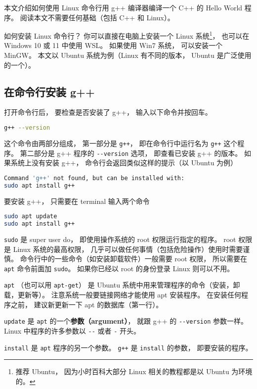 
本文介绍如何使用 Linux 命令行用 g++ 编译器编译一个 C++ 的 Hello World 程序。 阅读本文不需要任何基础（包括 C++ 和 Linux）。

如何安装 Linux 命令行？ 你可以直接在电脑上安装一个 Linux 系统\footnote{推荐 Ubuntu， 因为小时百科大部分 Linux 相关的教程都是以 Ubuntu 为环境的。}， 也可以在 Windows 10 或 11 中使用 WSL。 如果使用 Win7 系统， 可以安装一个 MinGW。 本文以 Ubuntu 系统为例（Linux 有不同的版本， Ubuntu 是广泛使用的一个）。

\subsection{在命令行安装 g++}
打开命令行后， 要检查是否安装了 g++， 输入以下命令并按回车。
\begin{lstlisting}[language=bash]
g++ --version
\end{lstlisting}
这个命令由两部分组成， 第一部分是 \verb|g++|， 即在命令行中运行名为 \verb|g++| 这个程序。 第二部分是 g++ 程序的 \verb|--version| 选项， 即查看已安装 g++ 的版本。 如果系统上没有安装 g++， 命令行会返回类似这样的提示（以 Ubuntu 为例）
\begin{lstlisting}[language=bash]
Command 'g++' not found, but can be installed with:
sudo apt install g++
\end{lstlisting}
要安装 g++， 只需要在 terminal 输入两个命令
\begin{lstlisting}[language=bash]
sudo apt update
sudo apt install g++
\end{lstlisting}
\verb|sudo| 是 super user do， 即使用操作系统的 root 权限运行指定的程序。 root 权限是 Linux 系统的最高权限， 几乎可以做任何事情（包括危险操作）使用时需要谨慎。 命令行中的一些命令（如安装卸载软件）一般需要 root 权限， 所以需要在 \verb|apt| 命令前面加 \verb|sudo|。 如果你已经以 root 的身份登录 Linux 则可以不用。

\verb|apt| （也可以用 \verb|apt-get|） 是 Ubuntu 系统中用来管理程序的命令（安装，卸载，更新等）。 注意系统一般要链接网络才能使用 apt 安装程序。 在安装任何程序之前， 建议新更新一下 apt 的数据库（第一行）。

\verb|update| 是 \verb|apt| 的一个\textbf{参数（argument）}， 就跟 g++ 的 \verb|--version| 参数一样。 Linux 中程序的许多参数以 \verb|--| 或者 \verb|-| 开头。

\verb|install| 是 \verb|apt| 程序的另一个参数。 \verb|g++| 是 \verb|install| 的参数， 即要安装的程序。

